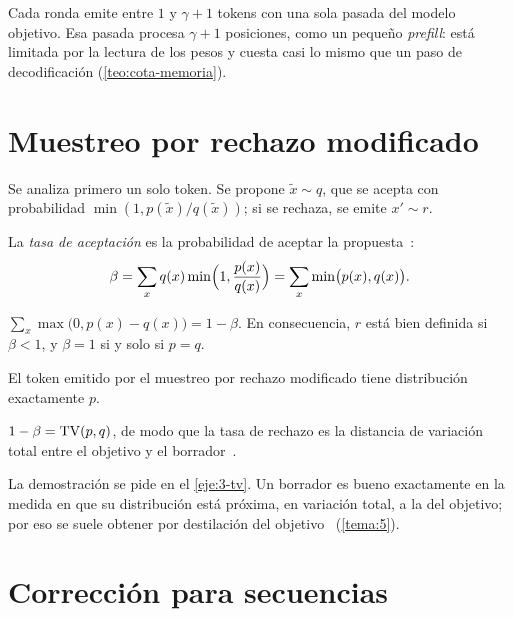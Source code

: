 Cada ronda emite entre $1$ y $\gamma+1$ tokens con una sola pasada del modelo objetivo. Esa pasada procesa $\gamma+1$ posiciones, como un pequeño \emph{prefill}: está limitada por la lectura de los pesos y cuesta casi lo mismo que un paso de decodificación (\cref{teo:cota-memoria}).

\addtocounter{figure}{1}%

\section{Muestreo por rechazo modificado}

Se analiza primero un solo token. Se propone $\tilde x\sim q$, que se acepta con probabilidad $\min(1,p(\tilde x)/q(\tilde x))$; si se rechaza, se emite $x'\sim r$.

\begin{definicion}\label{def:beta}
La \emph{tasa de aceptación} es la probabilidad de aceptar la propuesta~\cite[definición~3.1]{leviathan}:
\[
\beta=\sum_{x}q(x)\min\Bigl(1,\frac{p(x)}{q(x)}\Bigr)=\sum_{x}\min\bigl(p(x),q(x)\bigr).
\]
\end{definicion}

\begin{lema}\label{lem:residuo}
$\sum_{x}\max\bigl(0,p(x)-q(x)\bigr)=1-\beta$. En consecuencia, $r$ está bien definida si $\beta<1$, y $\beta=1$ si y solo si $p=q$.
\end{lema}

\begin{teorema}\label{teo:especulativa}
El token emitido por el muestreo por rechazo modificado tiene distribución exactamente $p$.
\end{teorema}

\begin{proposicion}\label{prop:beta-tv}
$1-\beta=\operatorname{TV}(p,q)$, de modo que la tasa de rechazo es la distancia de variación total entre el objetivo y el borrador~\cite[lema~3.3 y teorema~3.5]{leviathan}.
\end{proposicion}

La demostración se pide en el \cref{eje:3-tv}. Un borrador es bueno exactamente en la medida en que su distribución está próxima, en variación total, a la del objetivo; por eso se suele obtener por destilación del objetivo~\cite{cs336} (\cref{tema:5}).

\addtocounter{definicion}{1}%

\section{Corrección para secuencias}

